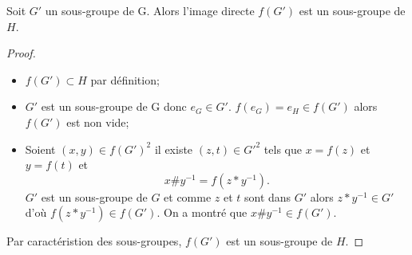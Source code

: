 \begin{theo}
  \label{theo:theo1sousgroupe}
  Soit $G'$ un sous-groupe de G. Alors l'image directe $f(G')$ est un sous-groupe de $H$. 
\end{theo}
\begin{proof}
  \begin{itemize}
  \item $f(G') \subset H$ par définition;
  \item $G'$ est un sous-groupe de G donc $e_G \in G'$. $f(e_G)=e_H \in f(G')$ alors $f(G')$ est non vide;
  \item Soient $(x,y) \in f(G')^2$ il existe $(z,t) \in G'^2$ tels que $x=f(z)$ et $y=f(t)$ et
    \begin{equation}
      x\#y^{-1}  = f(z*y^{-1}).
    \end{equation}
    $G'$ est un sous-groupe de $G$ et comme $z$ et $t$ sont dans $G'$ alors $z*y^{-1} \in G'$ d'où $f(z*y^{-1}) \in f(G')$. On a montré que $x\#y^{-1} \in f(G')$.
  \end{itemize}
  Par caractéristion des sous-groupes, $f(G')$ est un sous-groupe de $H$.
\end{proof}

